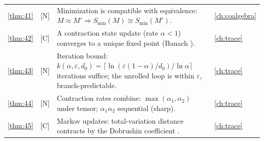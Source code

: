\begin{table}[!htbp]
\begin{tabular}{@{}clp{7.2cm}l@{}}
\ref{thm:41} & [N] & Minimization is compatible with equivalence: $M \approx M' \Rightarrow S_{\min} (M) \cong S_{\min} (M')$. & \autoref{ch:coalgebra}\\
\ref{thm:42} & [C] & A contraction state update (rate $\alpha < 1$) converges to a unique fixed point (Banach \cite{banach}). & \autoref{ch:trace}\\
\ref{thm:43} & [N] & Iteration bound: $k (\alpha,\varepsilon,d_0) = \lceil \ln (\varepsilon (1-\alpha)/d_0)/\ln\alpha\rceil$ iterations suffice; the unrolled loop is within $\varepsilon$, branch-predictable. & \autoref{ch:trace}\\
\ref{thm:44} & [N] & Contraction rates combine: $\max (\alpha_1,\alpha_2)$ under tensor; $\alpha_1\alpha_2$ sequential (sharp). & \autoref{ch:trace}\\
\ref{thm:45} & [C] & Markov updates: total-variation distance contracts by the Dobrushin coefficient \cite{dobroushin}. & \autoref{ch:trace}\\
\bottomrule
\end{tabular}
\end{table}

